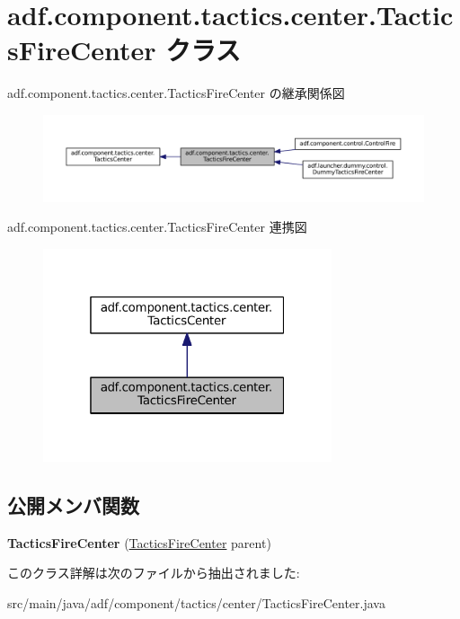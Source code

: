 \hypertarget{classadf_1_1component_1_1tactics_1_1center_1_1TacticsFireCenter}{}\section{adf.\+component.\+tactics.\+center.\+Tactics\+Fire\+Center クラス}
\label{classadf_1_1component_1_1tactics_1_1center_1_1TacticsFireCenter}


adf.\+component.\+tactics.\+center.\+Tactics\+Fire\+Center の継承関係図
\nopagebreak
\begin{figure}[H]
\begin{center}
\leavevmode
\includegraphics[width=350pt]{classadf_1_1component_1_1tactics_1_1center_1_1TacticsFireCenter__inherit__graph}
\end{center}
\end{figure}


adf.\+component.\+tactics.\+center.\+Tactics\+Fire\+Center 連携図
\nopagebreak
\begin{figure}[H]
\begin{center}
\leavevmode
\includegraphics[width=241pt]{classadf_1_1component_1_1tactics_1_1center_1_1TacticsFireCenter__coll__graph}
\end{center}
\end{figure}
\subsection*{公開メンバ関数}
\begin{DoxyCompactItemize}
\item 
\hypertarget{classadf_1_1component_1_1tactics_1_1center_1_1TacticsFireCenter_afc4ba6e95115a12f3a593ba067b1e2d3}{}\label{classadf_1_1component_1_1tactics_1_1center_1_1TacticsFireCenter_afc4ba6e95115a12f3a593ba067b1e2d3} 
{\bfseries Tactics\+Fire\+Center} (\hyperlink{classadf_1_1component_1_1tactics_1_1center_1_1TacticsFireCenter}{Tactics\+Fire\+Center} parent)
\end{DoxyCompactItemize}


このクラス詳解は次のファイルから抽出されました\+:\begin{DoxyCompactItemize}
\item 
src/main/java/adf/component/tactics/center/Tactics\+Fire\+Center.\+java\end{DoxyCompactItemize}
